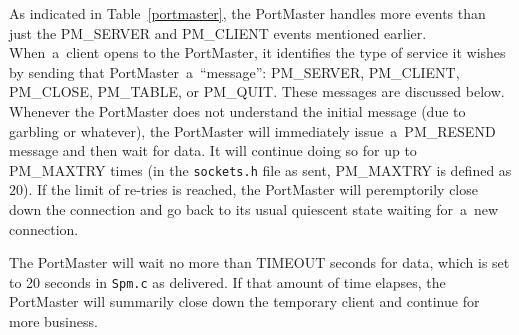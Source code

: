 \documentclass[12pt]{article}
\begin{document}
As indicated in Table~\ref{portmaster}, the PortMaster handles more events than
just the {\small PM\_SERVER} and {\small PM\_CLIENT} events mentioned earlier.
When~a~client opens to the PortMaster, it identifies the type of service it
wishes by sending that PortMaster~a~``message'':  {\small PM\_SERVER}, {\small
PM\_CLIENT}, {\small PM\_CLOSE}, {\small PM\_TABLE}, or {\small PM\_QUIT}.
These messages are discussed below.  Whenever the PortMaster does not
understand the initial message (due to garbling or whatever), the PortMaster
will immediately issue~a~{\small PM\_RESEND} message and then wait for data.
It will continue doing so for up to {\small PM\_MAXTRY} times (in the
\verb`sockets.h` file as sent, {\small PM\_MAXTRY} is defined as $20$).  If the
limit of re-tries is reached, the PortMaster will peremptorily close down the
connection and go back to its usual quiescent state waiting for~a~new
connection.

The PortMaster will wait no more than {\small TIMEOUT} seconds for data, which
is set to 20 seconds in \verb`Spm.c` as delivered.  If that amount of time
elapses, the PortMaster will summarily close down the temporary client and
continue for more business.
\end{document}
